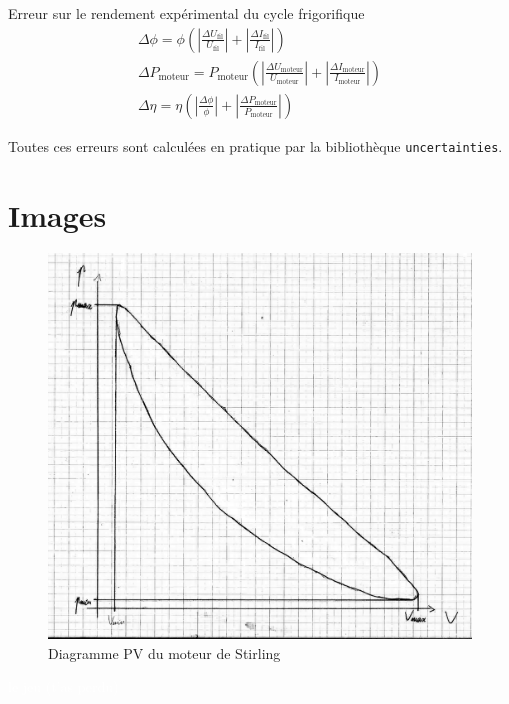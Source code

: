 Erreur sur le rendement expérimental du cycle frigorifique
\begin{eqnarray}
    \Delta \phi = \phi \left( \left|\frac{\Delta U_\textrm{fil}}{U_\textrm{fil}}\right| + \left|\frac{\Delta I_\textrm{fil}}{I_\textrm{fil}}\right| \right) \\
    \Delta P_\textrm{moteur} = P_\textrm{moteur} \left( \left|\frac{\Delta U_\textrm{moteur}}{U_\textrm{moteur}}\right| + \left|\frac{\Delta I_\textrm{moteur}}{I_\textrm{moteur}}\right| \right) \\
    \Delta \eta = \eta \left( \left|\frac{\Delta \phi}{\phi}\right| + \left|\frac{\Delta P_\textrm{moteur}}{P_\textrm{moteur}}\right| \right)
\end{eqnarray}

Toutes ces erreurs sont calculées en pratique par la bibliothèque \texttt{uncertainties}.

\section{Images}
\label{sec:image}

\begin{figure}[h]
    \centering
    \includegraphics[width=\linewidth]{figures/scan_graph.png}
    \caption{Diagramme PV du moteur de Stirling}
    \label{fig:diag_pv}
\end{figure}

\textcolor{white}{le jeu (t'as perdu)}
